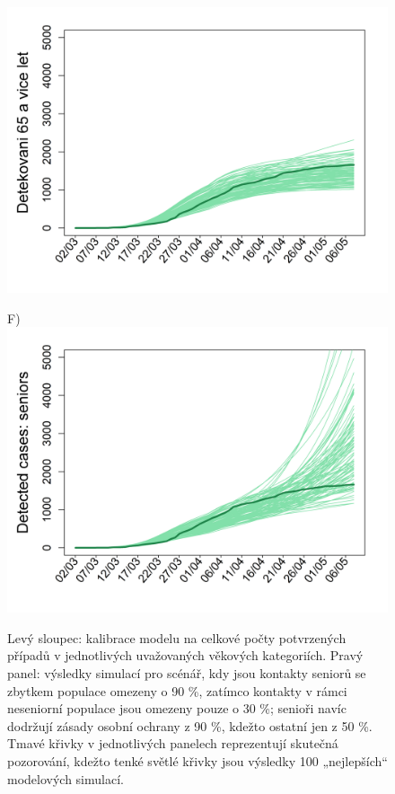 \begin{figure}
\begin{center}
\begin{minipage}[m]{0.45\textwidth}
			\includegraphics[width = \textwidth]{pic/sc_bas_3.png}
		\end{minipage}
		\begin{minipage}[m]{0.45\textwidth}
			F) \\
			\includegraphics[width = \textwidth]{pic/sc_old90_30_3.png}
		\end{minipage}
	\end{center}
	\caption{Levý sloupec: kalibrace modelu na celkové počty potvrzených případů v jednotlivých uvažovaných věkových kategoriích. Pravý panel: výsledky simulací pro scénář, kdy jsou kontakty seniorů se zbytkem populace omezeny o 90 \%, zatímco kontakty v rámci neseniorní populace jsou omezeny pouze o 30 \%; senioři navíc dodržují zásady osobní ochrany z 90 \%, kdežto ostatní jen z 50 \%. Tmavé křivky v jednotlivých panelech reprezentují skutečná pozorování, kdežto tenké světlé křivky jsou výsledky 100 „nejlepších“ modelových simulací.}
	\label{shelterning_seniors}
\end{figure}


